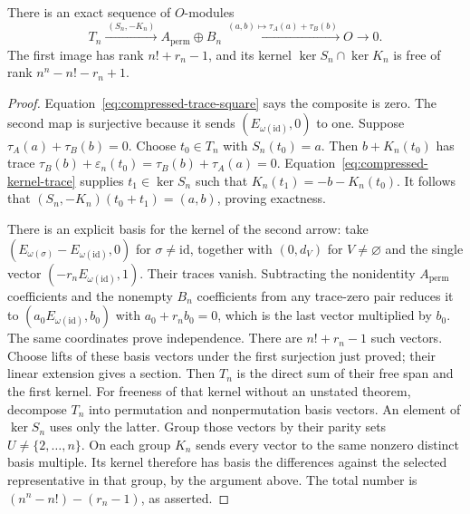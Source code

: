 \begin{proposition}\label{prop:compressed-exact-sequence}
There is an exact sequence of $O$-modules
\[
 T_n\xrightarrow{\ (S_n,-K_n)\ }
 A_{\mathrm{perm}}\oplus B_n
 \xrightarrow{\ (a,b)\mapsto\tau_A(a)+\tau_B(b)\ }O
 \longrightarrow0.
\]
The first image has rank $n!+r_n-1$, and its kernel
$\ker S_n\cap\ker K_n$ is free of rank $n^n-n!-r_n+1$.
\end{proposition}
\begin{proof}
Equation~\eqref{eq:compressed-trace-square} says the composite is
zero. The second map is surjective because it sends
$(E_{\omega(\mathrm{id})},0)$ to one. Suppose
$\tau_A(a)+\tau_B(b)=0$. Choose $t_0\in T_n$ with $S_n(t_0)=a$.
Then $b+K_n(t_0)$ has trace
$\tau_B(b)+\varepsilon_n(t_0)=\tau_B(b)+\tau_A(a)=0$.
Equation~\eqref{eq:compressed-kernel-trace} supplies
$t_1\in\ker S_n$ such that $K_n(t_1)=-b-K_n(t_0)$.
It follows that $(S_n,-K_n)(t_0+t_1)=(a,b)$, proving exactness.

There is an explicit basis for the kernel of the second arrow:
take $(E_{\omega(\sigma)}-E_{\omega(\mathrm{id})},0)$ for
$\sigma\ne\mathrm{id}$, together with
$(0,d_V)$ for $V\ne\varnothing$ and the single vector
$(-r_nE_{\omega(\mathrm{id})},1)$. Their traces vanish.
Subtracting the nonidentity $A_{\mathrm{perm}}$ coefficients and
the nonempty $B_n$ coefficients from any trace-zero pair reduces
it to $(a_0E_{\omega(\mathrm{id})},b_0)$ with
$a_0+r_nb_0=0$, which is the last vector multiplied by $b_0$.
The same coordinates prove independence. There are $n!+r_n-1$
such vectors. Choose lifts of these basis vectors under the first
surjection just proved; their linear extension gives a section.
Then $T_n$ is the direct sum of their free span and the first
kernel. For freeness of that kernel without an unstated theorem,
decompose $T_n$ into permutation and nonpermutation basis vectors.
An element of $\ker S_n$ uses only the latter. Group those vectors
by their parity sets $U\ne\{2,\ldots,n\}$. On each group $K_n$
sends every vector to the same nonzero distinct basis multiple.
Its kernel therefore has basis the differences against the selected
representative in that group, by the argument above. The total
number is $(n^n-n!)-(r_n-1)$, as asserted.
\end{proof}


